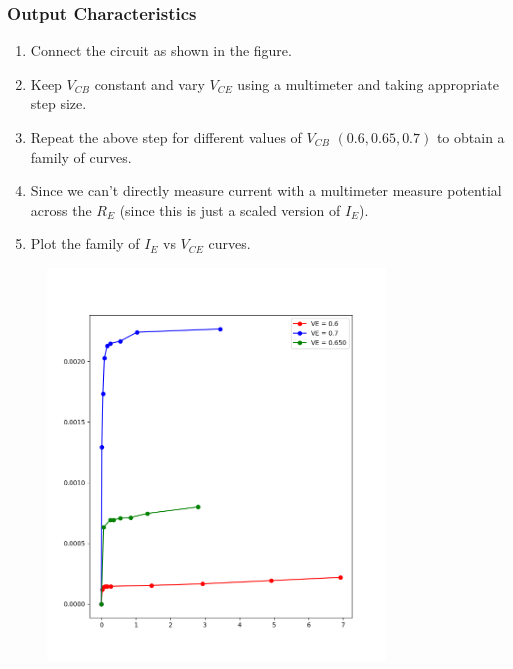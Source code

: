 \documentclass[12pt,a4paper]{article}
\begin{document}
\subsubsection{Output Characteristics}
\begin{enumerate}
    \item Connect the circuit as shown in the figure. 
    \item Keep $V_{CB}$ constant and vary $V_{CE}$ using a multimeter and taking appropriate step size.
    \item Repeat the above step for different values of $V_{CB}$ $(0.6, 0.65, 0.7)$ to obtain a family of curves.
    \item Since we can't directly measure current with a multimeter measure potential across the $R_E$ (since this is just a scaled version of $I_E$).
    \item Plot the family of $I_E$ vs $V_{CE}$ curves.
\end{enumerate}
\begin{figure}[H]
    \centering
    \includegraphics[width=0.8\textwidth]{Experiment_6/figs/cc_op.png}
\end{figure}
\end{document}
